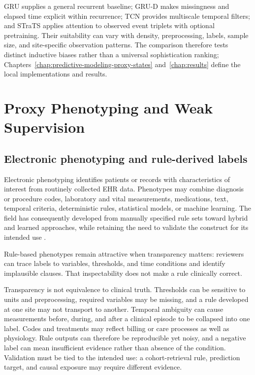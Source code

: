 GRU supplies a general recurrent baseline; GRU-D makes missingness and elapsed time explicit within recurrence; TCN provides multiscale temporal filters; and STraTS applies attention to observed event triplets with optional pretraining.  Their suitability can vary with density, preprocessing, labels, sample size, and site-specific observation patterns.  The comparison therefore tests distinct inductive biases rather than a universal sophistication ranking; Chapters~\ref{chap:predictive-modeling-proxy-states} and~\ref{chap:results} define the local implementations and results.

\section{Proxy Phenotyping and Weak Supervision}
\label{sec:background-related-work:proxy-phenotyping-weak-supervision}

\subsection{Electronic phenotyping and rule-derived labels}

Electronic phenotyping identifies patients or records with characteristics of interest from routinely collected EHR data.  Phenotypes may combine diagnosis or procedure codes, laboratory and vital measurements, medications, text, temporal criteria, deterministic rules, statistical models, or machine learning.  The field has consequently developed from manually specified rule sets toward hybrid and learned approaches, while retaining the need to validate the construct for its intended use \cite{banda_2018_electronic_phenotyping}.

Rule-based phenotypes remain attractive when transparency matters: reviewers can trace labels to variables, thresholds, and time conditions and identify implausible clauses.  That inspectability does not make a rule clinically correct.

Transparency is not equivalence to clinical truth.  Thresholds can be sensitive to units and preprocessing, required variables may be missing, and a rule developed at one site may not transport to another.  Temporal ambiguity can cause measurements before, during, and after a clinical episode to be collapsed into one label.  Codes and treatments may reflect billing or care processes as well as physiology.  Rule outputs can therefore be reproducible yet noisy, and a negative label can mean insufficient evidence rather than absence of the condition.  Validation must be tied to the intended use: a cohort-retrieval rule, prediction target, and causal exposure may require different evidence.


